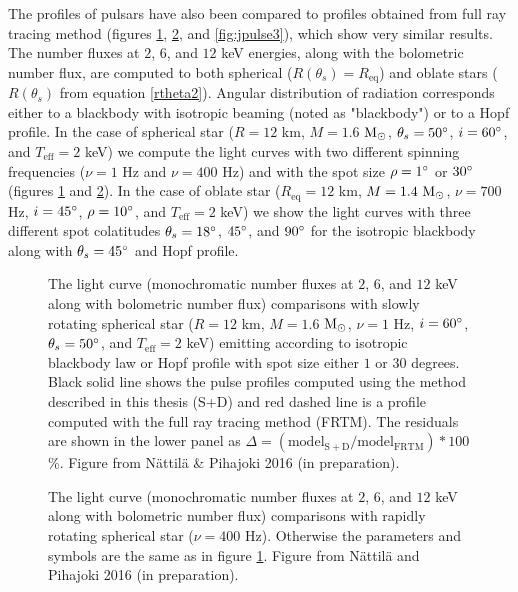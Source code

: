 \documentclass{wihuri}
\def\msun{{\rm M_{\odot}}}
\def\thetas{\theta_{s}}
\begin{document}
The profiles of pulsars have also been compared to profiles obtained from full ray tracing method (figures \ref{fig:jpulse1}, \ref{fig:jpulse2}, and \ref{fig:jpulse3}), which show very similar results. %
The number fluxes at $2$, $6$, and $12$ keV energies, along with the bolometric number flux, are computed to both spherical ($R(\thetas) = R_{\mathrm{eq}}$) and oblate stars ($R(\thetas)$ from equation \ref{rtheta2}). Angular distribution of radiation corresponds either to a blackbody with isotropic beaming (noted as "blackbody") or to a Hopf profile. %
In the case of spherical star ($R = 12$ km, $M = 1.6$ $\msun$, $\thetas = 50 \degree$, $i = 60 \degree$, and $T_{\mathrm{eff}} = 2$ keV) we compute the light curves with two different spinning frequencies ($\nu = 1$ Hz and $\nu = 400$ Hz) and with the spot size $\rho = 1 \degree$ or $30 \degree$ (figures \ref{fig:jpulse1} and \ref{fig:jpulse2}). In the case of oblate star ($R_{\mathrm{eq}} = 12$ km, $M = 1.4  ~\msun$, $\nu = 700$ Hz, $i = 45 \degree$, $\rho = 10 \degree$, and $T_{\mathrm{eff}} = 2$ keV) we show the light curves with three different spot colatitudes $\thetas  = 18 \degree$,   $45 \degree$, and $90 \degree$ for the isotropic blackbody along with $\thetas = 45 \degree$ and Hopf profile.





\begin{figure}
\centerline{}
\caption{The light curve (monochromatic number fluxes at $2$, $6$, and $12$ keV along with bolometric number flux) comparisons with slowly rotating spherical star ($R = 12$ km, $M = 1.6$ $\msun$, $\nu = 1$ Hz, $i = 60 \degree$, $\thetas = 50 \degree$, and $T_{\mathrm{eff}} = 2$ keV) emitting according to isotropic blackbody law or Hopf profile with spot size either $1$ or $30$ degrees. Black solid line shows the pulse profiles computed using the method described in this thesis (S+D) and red dashed line is a profile computed with the full ray tracing method (FRTM). The residuals are shown in the lower panel as $\Delta = (\mathrm{model}_{\mathrm{S+D}}/\mathrm{model}_{\mathrm{FRTM}})*100$ \%. Figure from Nättilä \& Pihajoki 2016 (in preparation).
\label{fig:jpulse1}}
\end{figure}


\begin{figure}
\centerline{}
\caption{The light curve (monochromatic number fluxes at $2$, $6$, and $12$ keV along with bolometric number flux) comparisons with rapidly rotating spherical star ($\nu = 400$ Hz). Otherwise the parameters and symbols are the same as in figure \ref{fig:jpulse1}. Figure from Nättilä and Pihajoki 2016 (in preparation).
\label{fig:jpulse2}}
\end{figure}
\end{document}
